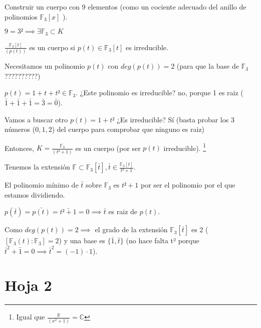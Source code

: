 \begin{problem}[6]
 \label{H1.E6}
 Construir un cuerpo con 9 elementos (como un cociente adecuado del anillo de polinomios $\mathbb{F}_3 [x]$ ).

\solution

$9=3² \implies ∃ \mathbb{F}_3 \subset K$

$\displaystyle \frac{\mathbb{F}_3[t]}{(p(t))}$ es un cuerpo si $p(t) \in \mathbb{F}_3[t]$ es irreducible.


Necesitamos un polinomio $p(t)$ con $deg(p(t)) = 2$ (para que la base de $\mathbb{F}_3$ ??????????)

$p(t) = 1+t+t² ∈ \mathbb{F}_3$. ¿Este polinomio es irreducible? no, porque 1 es raiz ($\bar{1}+\bar{1}+\bar{1}=\bar{3} = \bar{0}$).

Vamos a buscar otro $p(t) = 1+t²$ ¿Es irreducible? Sí (basta probar los 3 números ($0,1,2$) del cuerpo para comprobar que ninguno es raiz)

Entonces, $K = \frac{\mathbb{F}_3}{(t²+1)}$ es un cuerpo (por ser $p(t)$ irreducible). \footnote{Igual que $\displaystyle\frac{ℝ}{(x^2+1)} = ℂ$}

Tenemos la extensión $\mathbb{F} \subset \mathbb{F}_3[\bar{t}], \bar{t}∈ \frac{\mathbb{F}_3[t]}{t²+1}$. 

El polinomio mínimo de $\bar{t}$ sobre $\mathbb{F}_3$ es $t²+1$ por ser el polinomio por el que estamos dividiendo.


$p(\bar{t}) = \bar{p(t)} = \bar{t²+1} = 0 \implies \bar{t}$ es raiz de $p(t)$.

Como $deg(p(t)) = 2 \implies $ el grado de la extensión $\mathbb{F}_3[\bar{t}]$ es 2 ($[\mathbb{F}_3(t):\mathbb{F}_3]=2$) y una base es $\{\bar{1},\bar{t}\}$ (no hace falta t² porque $\bar{t}^2 + \bar{1} = 0 \implies \bar{t}^2 = (-1)·1$).
\end{problem}








\section{Hoja 2}

